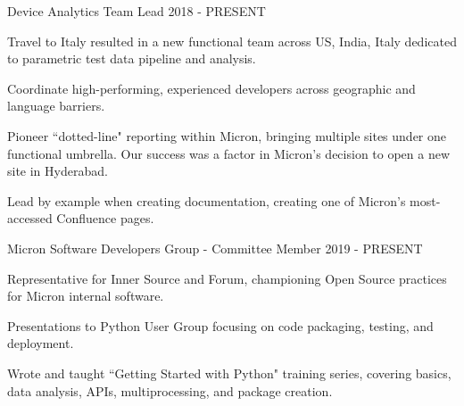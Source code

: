

\begin{cventries}

  \cventry
    {Device Analytics Team Lead} %
    {} %
    {} %
    {2018 - PRESENT} %
    {
      \begin{cvitems} %
        \item {Travel to Italy resulted in a new functional team across US, India, Italy dedicated to parametric test data pipeline and analysis.}
        \item {Coordinate high-performing, experienced developers across geographic and language barriers.}
        \item {Pioneer ``dotted-line" reporting within Micron, bringing multiple sites under one functional umbrella. Our success was a factor in Micron's decision to open a new site in Hyderabad.}
        \item {Lead by example when creating documentation, creating one of Micron's most-accessed Confluence pages.}
      \end{cvitems}
    }
  \cventry
    {Micron Software Developers Group - Committee Member} %
    {} %
    {} %
    {2019 - PRESENT} %
    {
      \begin{cvitems} %
        \item {Representative for Inner Source and Forum, championing Open Source practices for Micron internal software.}
        \item {Presentations to Python User Group focusing on code packaging, testing, and deployment.}
        \item {Wrote and taught ``Getting Started with Python" training series, covering basics, data analysis, APIs, multiprocessing, and package creation.}
      \end{cvitems}
    }
\end{cventries}
